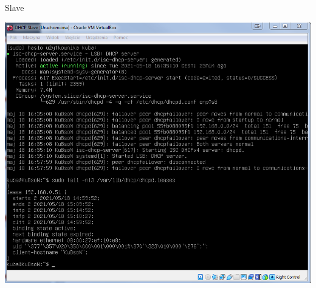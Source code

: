 \documentclass[presentation]{beamer}
\begin{document}
\begin{frame}[label={sec:orgb1c5858}]{}
\begin{columns}
\begin{column}{0.55\columnwidth}
\begin{block}{Slave}
\begin{center}
\includegraphics[width=.9\linewidth]{./data/dhcp/11_slave.png}
\end{center}
\end{block}
\end{column}
\end{columns}
\end{frame}
\end{document}

